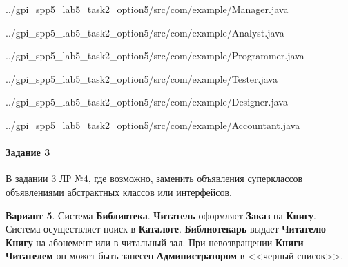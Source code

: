 
{../gpi_spp5_lab5_task2_option5/src/com/example/Manager.java}


{../gpi_spp5_lab5_task2_option5/src/com/example/Analyst.java}


{../gpi_spp5_lab5_task2_option5/src/com/example/Programmer.java}


{../gpi_spp5_lab5_task2_option5/src/com/example/Tester.java}


{../gpi_spp5_lab5_task2_option5/src/com/example/Designer.java}


{../gpi_spp5_lab5_task2_option5/src/com/example/Accountant.java}


\paragraph{Задание 3} \hspace{0cm}

В задании 3 ЛР №4, где возможно,
заменить объявления суперклассов объявлениями абстрактных классов или интерфейсов.

\textbf{Вариант 5}.
Система \textbf{Библиотека}. \textbf{Читатель} оформляет \textbf{Заказ} на \textbf{Книгу}.
Система осуществляет поиск в \textbf{Каталоге}.
\textbf{Библиотекарь} выдает \textbf{Читателю Книгу} на абонемент или в читальный зал.
При невозвращении \textbf{Книги Читателем}
он может быть занесен \textbf{Администратором} в <<черный список>>.
